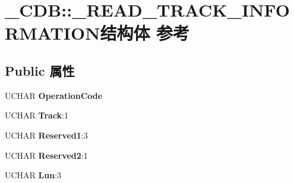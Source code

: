 \hypertarget{struct___c_d_b_1_1___r_e_a_d___t_r_a_c_k___i_n_f_o_r_m_a_t_i_o_n}{}\section{\+\_\+\+C\+DB\+:\+:\+\_\+\+R\+E\+A\+D\+\_\+\+T\+R\+A\+C\+K\+\_\+\+I\+N\+F\+O\+R\+M\+A\+T\+I\+O\+N结构体 参考}
\label{struct___c_d_b_1_1___r_e_a_d___t_r_a_c_k___i_n_f_o_r_m_a_t_i_o_n}
\subsection*{Public 属性}
\begin{DoxyCompactItemize}
\item 
\mbox{\label{struct___c_d_b_1_1___r_e_a_d___t_r_a_c_k___i_n_f_o_r_m_a_t_i_o_n_a249cbb2d35e2ba6c568f2977df039428}} 
U\+C\+H\+AR {\bfseries Operation\+Code}
\item 
\mbox{\label{struct___c_d_b_1_1___r_e_a_d___t_r_a_c_k___i_n_f_o_r_m_a_t_i_o_n_a8875ce821a3f65c92f68effa8a0cff9f}} 
U\+C\+H\+AR {\bfseries Track}\+:1
\item 
\mbox{\label{struct___c_d_b_1_1___r_e_a_d___t_r_a_c_k___i_n_f_o_r_m_a_t_i_o_n_a06e9730089ab07f9e7669394526e370e}} 
U\+C\+H\+AR {\bfseries Reserved1}\+:3
\item 
\mbox{\label{struct___c_d_b_1_1___r_e_a_d___t_r_a_c_k___i_n_f_o_r_m_a_t_i_o_n_abc39bb22c08d6e989673f74ce558a9e2}} 
U\+C\+H\+AR {\bfseries Reserved2}\+:1
\item 
\mbox{\label{struct___c_d_b_1_1___r_e_a_d___t_r_a_c_k___i_n_f_o_r_m_a_t_i_o_n_a5442d967792f1729c7f8d8e7eabb437a}} 
U\+C\+H\+AR {\bfseries Lun}\+:3
\item 
\mbox{\label{struct___c_d_b_1_1___r_e_a_d___t_r_a_c_k___i_n_f_o_r_m_a_t_i_o_n_a10c5d715dae0d3574080f699b7726707}} 

\end{DoxyCompactItemize}
